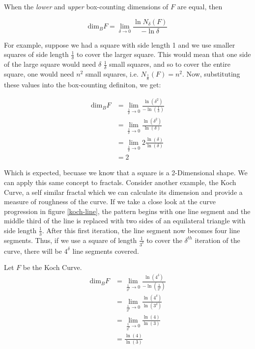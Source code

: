 \documentclass[a4paper,11pt,twoside]{article}
\begin{document}
When the \emph{lower} and \emph{upper} box-counting dimensions of \(F\) are equal, then

\begin{equation*}
\text{dim}_BF = \lim_{\delta \to 0} \frac{\ln N_\delta(F)}{-\ln \delta}
\end{equation*}

For example, suppose we had a square with side length 1 and we use smaller squares of side
length \(\frac{1}{\delta}\) to cover the larger square. This would mean that one side of the
large square would need \(\delta\) \(\frac{1}{\delta}\) small squares, and so to cover
the entire square, one would need \(n^2\) small squares, i.e. \(N_{\frac{1}{n}}(F) = n^2\). Now,
substituting these values into the box-counting definiton, we get:

\begin{align*}
\text{dim}_BF &= \lim_{\frac{1}{\delta} \to 0} \frac{\ln(\delta^2)}{-\ln(\frac{1}{\delta})}\\
&= \lim_{\frac{1}{\delta} \to 0} \frac{\ln(\delta^2)}{\ln(\delta)}\\
&= \lim_{\frac{1}{\delta} \to 0} 2\frac{\ln(\delta)}{\ln(\delta)}\\
&= 2
\end{align*}

Which is expected, becuase we know that a square is a 2-Dimensional shape. We
can apply this same concept to fractals. Consider another example, the Koch
Curve, a self similar fractal which we can calculate its dimension and provide a
measure of roughness of the curve. If we take a close look at the curve progression
in figure \ref{koch-line}, the pattern begins with one line segment and the middle third
of the line is replaced with two sides of an equilateral triangle with side length
\(\frac{1}{3}\). After this first iteration, the line segment now becomes four line
segments. Thus, if we use a square of length \(\frac{1}{3^{\delta}}\) to cover the \(\delta^{th}\)
iteration of the curve, there will be \(4^{\delta}\) line segments covered.

Let \(F\) be the Koch Curve.
\begin{align*}
\text{dim}_BF &= \lim_{\frac{1}{3^{\delta}} \to 0} \frac{\ln(4^{\delta})}{-\ln(\frac{1}{3^{\delta}})}\\
&= \lim_{\frac{1}{3^{\delta}} \to 0} \frac{\ln(4^{\delta})}{\ln(3^{\delta})}\\
&= \lim_{\frac{1}{3^{\delta}} \to 0} \frac{\ln(4)}{\ln(3)}\\
&= \frac{\ln(4)}{\ln(3)}
\end{align*}
\end{document}
